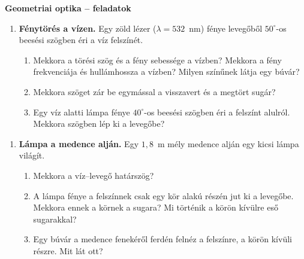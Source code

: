 \documentclass[12pt]{article}
\begin{document}
\begin{center}\vspace*{-0.4cm}
  {\Large\bfseries Geometriai optika -- feladatok}\\[4pt]
\end{center}

\begin{enumerate}
\item \textbf{Fénytörés a vízen.} Egy zöld lézer ($\lambda = 532$~nm) fénye levegőből
  $50^\circ$-os beesési szögben éri a víz felszínét.
  \begin{enumerate}
    \item Mekkora a törési szög és a fény sebessége a vízben? Mekkora a fény frekvenciája
      és hullámhossza a vízben? Milyen színűnek látja egy búvár?
    \item Mekkora szöget zár be egymással a visszavert és a megtört sugár?
    \item Egy víz alatti lámpa fénye $40^\circ$-os beesési szögben éri a felszínt alulról.
      Mekkora szögben lép ki a levegőbe?
  \end{enumerate}
\end{enumerate}

\begin{minipage}[t]{0.70\linewidth}\vspace{0pt}
\begin{enumerate}[start=2]
\item \textbf{Lámpa a medence alján.} Egy $1{,}8$~m mély medence alján egy kicsi lámpa
  világít.
  \begin{enumerate}
    \item Mekkora a víz--levegő határszög?
    \item A lámpa fénye a felszínnek csak egy kör alakú részén jut ki a levegőbe. Mekkora
      ennek a körnek a sugara? Mi történik a körön kívülre eső sugarakkal?
    \item Egy búvár a medence fenekéről ferdén felnéz a felszínre, a körön kívüli részre.
      Mit lát ott?
  \end{enumerate}
\end{enumerate}
\end{minipage}\hfill
\begin{minipage}[t]{0.27\linewidth}\vspace{0pt}\centering
{}
\end{minipage}
\end{document}
